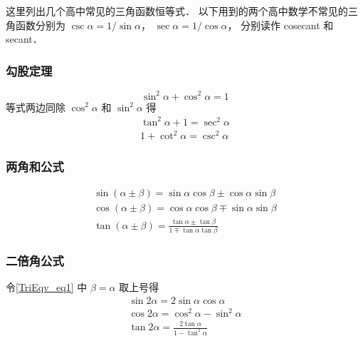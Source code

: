 

这里列出几个高中常见的三角函数恒等式． 以下用到的两个高中数学不常见的三角函数分别为 $\csc \alpha= 1/\sin \alpha$， $\sec \alpha = 1/\cos \alpha$， 分别读作 cosecant 和 secant．

\subsubsection{勾股定理}
\begin{equation}
\sin^2 \alpha + \cos^2 \alpha = 1
\end{equation}
等式两边同除 $\cos^2 \alpha$ 和 $\sin^2 \alpha$ 得
\begin{gather}
\label{TriEqv_eq13}
\tan^2 \alpha + 1 = \sec^2 \alpha\\
1 + \cot^2\alpha = \csc^2\alpha
\end{gather}

\subsubsection{两角和公式}
\begin{gather}\label{TriEqv_eq1}
\sin(\alpha\pm \beta) = \sin \alpha\cos \beta \pm \cos \alpha\sin \beta\\
\label{TriEqv_eq2}
\cos(\alpha\pm \beta) = \cos \alpha\cos \beta \mp \sin \alpha\sin \beta\\
\tan(\alpha\pm \beta) = \frac{\tan \alpha \pm \tan \beta}{1 \mp \tan \alpha \tan \beta}
\end{gather}

\subsubsection{二倍角公式}

令\autoref{TriEqv_eq1} 中 $\beta=\alpha$ 取上号得
\begin{gather}
\sin 2\alpha = 2\sin \alpha\cos \alpha\\
\label{TriEqv_eq4}
\cos 2\alpha = \cos^2 \alpha - \sin^2 \alpha\\
\tan 2\alpha = \frac{2\tan \alpha}{1 - \tan^2 \alpha}
\end{gather}

